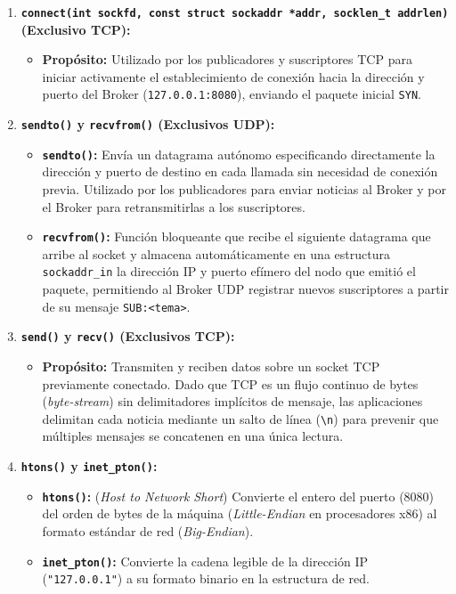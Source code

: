 \documentclass[11pt,a4paper]{article}
\begin{document}
\begin{enumerate}
    \item \textbf{\texttt{connect(int sockfd, const struct sockaddr *addr, socklen\_t addrlen)} (Exclusivo TCP):}
    \begin{itemize}
        \item \textbf{Propósito:} Utilizado por los publicadores y suscriptores TCP para iniciar activamente el establecimiento de conexión hacia la dirección y puerto del Broker (\texttt{127.0.0.1:8080}), enviando el paquete inicial \texttt{SYN}.
    \end{itemize}

    \item \textbf{\texttt{sendto()} y \texttt{recvfrom()} (Exclusivos UDP):}
    \begin{itemize}
        \item \textbf{\texttt{sendto()}:} Envía un datagrama autónomo especificando directamente la dirección y puerto de destino en cada llamada sin necesidad de conexión previa. Utilizado por los publicadores para enviar noticias al Broker y por el Broker para retransmitirlas a los suscriptores.
        \item \textbf{\texttt{recvfrom()}:} Función bloqueante que recibe el siguiente datagrama que arribe al socket y almacena automáticamente en una estructura \texttt{sockaddr\_in} la dirección IP y puerto efímero del nodo que emitió el paquete, permitiendo al Broker UDP registrar nuevos suscriptores a partir de su mensaje \texttt{SUB:<tema>}.
    \end{itemize}

    \item \textbf{\texttt{send()} y \texttt{recv()} (Exclusivos TCP):}
    \begin{itemize}
        \item \textbf{Propósito:} Transmiten y reciben datos sobre un socket TCP previamente conectado. Dado que TCP es un flujo continuo de bytes (\textit{byte-stream}) sin delimitadores implícitos de mensaje, las aplicaciones delimitan cada noticia mediante un salto de línea (\verb|\n|) para prevenir que múltiples mensajes se concatenen en una única lectura.
    \end{itemize}

    \item \textbf{\texttt{htons()} y \texttt{inet\_pton()}:}
    \begin{itemize}
        \item \textbf{\texttt{htons()}:} (\textit{Host to Network Short}) Convierte el entero del puerto (8080) del orden de bytes de la máquina (\textit{Little-Endian} en procesadores x86) al formato estándar de red (\textit{Big-Endian}).
        \item \textbf{\texttt{inet\_pton()}:} Convierte la cadena legible de la dirección IP (\texttt{"127.0.0.1"}) a su formato binario en la estructura de red.
    \end{itemize}
\end{enumerate}
\end{document}
